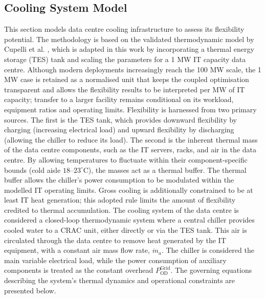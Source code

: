 \documentclass[lettersize,journal]{IEEEtran}
\newcommand{\rev}[1]{#1}
\begin{document}
\subsection{Cooling System Model} \label{sec: Cooling Infrastructure Flexibility} 
This section models data centre cooling infrastructure to assess its flexibility potential. The methodology is based on the validated thermodynamic model by Cupelli et al. \cite{cupelli2018data}, which is adapted in this work by incorporating a thermal energy storage (TES) tank and scaling the parameters for a 1 MW IT capacity data centre. \rev{Although modern deployments increasingly reach the 100 MW scale, the 1 MW case is retained as a normalised unit that keeps the coupled optimisation transparent and allows the flexibility results to be interpreted per MW of IT capacity; transfer to a larger facility remains conditional on its workload, equipment ratios and operating limits.}
Flexibility is harnessed from two primary sources. The first is the TES tank, which provides downward flexibility by charging (increasing electrical load) and upward flexibility by discharging (allowing the chiller to reduce its load). The second is the inherent thermal mass of the data centre components, such as the IT servers, racks, and air in the data centre. By allowing temperatures to fluctuate within their component-specific bounds (cold aisle $18$--$23^\circ$C), the masses act as a thermal buffer. The thermal buffer allows the chiller's power consumption to be modulated within the modelled IT operating limits. Gross cooling is additionally constrained to be at least IT heat generation; this adopted rule limits the amount of flexibility credited to thermal accumulation.
The cooling system of the data centre is considered a closed-loop thermodynamic system where a central chiller provides cooled water to a CRAC unit, either directly or via the TES tank. This air is circulated through the data centre to remove heat generated by the IT equipment, with a constant air mass flow rate, $\dot{m}_{a}$. The chiller is considered the main variable electrical load, while the power consumption of auxiliary components is treated as \rev{the constant overhead $P^{\mathrm{Grid}}_{\mathrm{OD}}$}. The governing equations describing the system's thermal dynamics and operational constraints are presented below.
\end{document}
